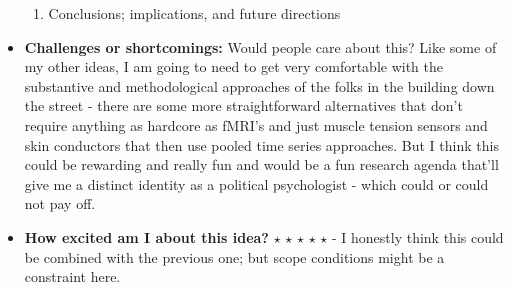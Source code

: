 \documentclass[12pt]{article}
\begin{document}
\begin{itemize}
\begin{enumerate}
            \item Conclusions; implications, and future directions
        \end{enumerate}
        \item \textbf{Challenges or shortcomings:} Would people care about this? Like some of my other ideas, I am going to need to get very comfortable with the substantive and methodological approaches of the folks in the building down the street - there are some more straightforward alternatives that don't require anything as hardcore as fMRI's and just muscle tension sensors and skin conductors that then use pooled time series approaches. But I think this could be rewarding and really fun and would be a fun research agenda that'll give me a distinct identity as a political psychologist - which could or could not pay off.
        \item \textbf{How excited am I about this idea?} $\star$ $\star$ $\star$ $\star$ $\star$ - I honestly think this could be combined with the previous one; but scope conditions might be a constraint here.
    \end{itemize}
\end{document}
